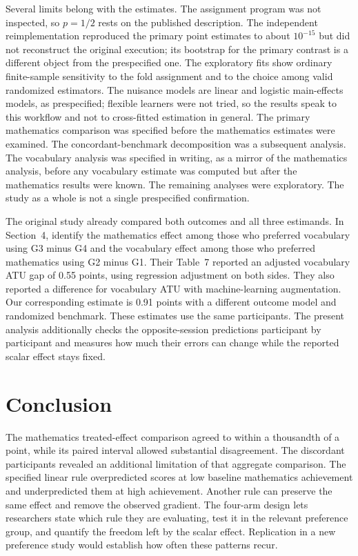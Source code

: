 \documentclass[twoside,11pt]{article}
\begin{document}
Several limits belong with the estimates. The assignment program was not inspected, so $p=1/2$ rests on the published description. The independent reimplementation reproduced the primary point estimates to about $10^{-15}$ but did not reconstruct the original execution; its bootstrap for the primary contrast is a different object from the prespecified one. The exploratory fits show ordinary finite-sample sensitivity to the fold assignment and to the choice among valid randomized estimators. The nuisance models are linear and logistic main-effects models, as prespecified; flexible learners were not tried, so the results speak to this workflow and not to cross-fitted estimation in general. The primary mathematics comparison was specified before the mathematics estimates were examined. The concordant-benchmark decomposition was a subsequent analysis. The vocabulary analysis was specified in writing, as a mirror of the mathematics analysis, before any vocabulary estimate was computed but after the mathematics results were known. The remaining analyses were exploratory. The study as a whole is not a single prespecified confirmation.

The original study already compared both outcomes and all three estimands. In Section~4, \citet{keller2025} identify the mathematics effect among those who preferred vocabulary using G3 minus G4 and the vocabulary effect among those who preferred mathematics using G2 minus G1. Their Table~7 reported an adjusted vocabulary ATU gap of 0.55 points, using regression adjustment on both sides. They also reported a difference for vocabulary ATU with machine-learning augmentation. Our corresponding estimate is 0.91 points with a different outcome model and randomized benchmark. These estimates use the same participants. The present analysis additionally checks the opposite-session predictions participant by participant and measures how much their errors can change while the reported scalar effect stays fixed.

\section{Conclusion}
\label{sec:conclusion}

The mathematics treated-effect comparison agreed to within a thousandth of a point, while its paired interval allowed substantial disagreement. The discordant participants revealed an additional limitation of that aggregate comparison. The specified linear rule overpredicted scores at low baseline mathematics achievement and underpredicted them at high achievement. Another rule can preserve the same effect and remove the observed gradient. The four-arm design lets researchers state which rule they are evaluating, test it in the relevant preference group, and quantify the freedom left by the scalar effect. Replication in a new preference study would establish how often these patterns recur.
\end{document}
